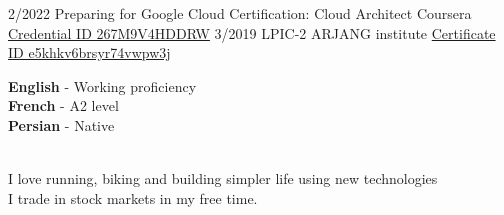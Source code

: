 \documentclass[9pt]{developercv}
\begin{document}


\begin{entrylist}
	\entry
	{2/2022}
	{Preparing for Google Cloud Certification: Cloud Architect}
	{Coursera}
	{{\href{https://www.coursera.org/account/accomplishments/professional-cert/267M9V4HDDRW}{Credential ID 267M9V4HDDRW}}}
	\entry
	{3/2019}
	{LPIC-2}
	{ARJANG institute}
	{{\href{http://gotoclass.ir/Certificates/e5khkv6brsyr74vwpw3j/}{Certificate ID e5khkv6brsyr74vwpw3j}}}

\end{entrylist}


\begin{minipage}[t]{0.45\textwidth}
	\vspace{-\baselineskip} %


	\textbf{English} - Working proficiency\\
	\textbf{French} - A2 level\\
	\textbf{Persian} - Native\\\
\end{minipage}
\hfill
\begin{minipage}[t]{0.45\textwidth}
	\vspace{-\baselineskip} %


	I love running, biking and building simpler life using new technologies\\
	I trade in stock markets in my free time.
\end{minipage}
\end{document}
